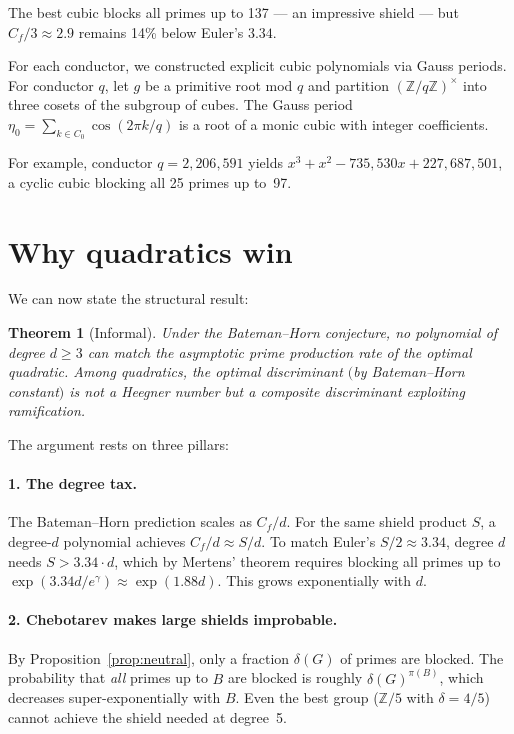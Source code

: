 \documentclass[11pt,a4paper]{article}
\newtheorem{theorem}{Theorem}
\theoremstyle{definition}
\theoremstyle{remark}
\newcommand{\Z}{\mathbb{Z}}
\begin{document}
The best cubic blocks all primes up to 137 --- an impressive shield --- but $C_f/3 \approx 2.9$ remains 14\% below Euler's $3.34$.

For each conductor, we constructed explicit cubic polynomials via Gauss periods.
For conductor $q$, let $g$ be a primitive root mod $q$ and partition $(\Z/q\Z)^\times$ into three cosets of the subgroup of cubes.
The Gauss period $\eta_0 = \sum_{k \in C_0} \cos(2\pi k/q)$ is a root of a monic cubic with integer coefficients.

For example, conductor $q = 2{,}206{,}591$ yields $x^3 + x^2 - 735{,}530x + 227{,}687{,}501$, a cyclic cubic blocking all 25 primes up to~97.


\section{Why quadratics win}\label{sec:why}

We can now state the structural result:

\begin{theorem}[Informal]
Under the Bateman--Horn conjecture, no polynomial of degree $d \geq 3$ can match the asymptotic prime production rate of the optimal quadratic.
Among quadratics, the optimal discriminant $($by Bateman--Horn constant$)$ is not a Heegner number but a composite discriminant exploiting ramification.
\end{theorem}

The argument rests on three pillars:

\paragraph{1. The degree tax.}
The Bateman--Horn prediction scales as $C_f/d$.
For the same shield product $S$, a degree-$d$ polynomial achieves $C_f/d \approx S/d$.
To match Euler's $S/2 \approx 3.34$, degree $d$ needs $S > 3.34 \cdot d$, which by Mertens' theorem requires blocking all primes up to $\exp(3.34d / e^\gamma) \approx \exp(1.88d)$.
This grows exponentially with $d$.

\paragraph{2. Chebotarev makes large shields improbable.}
By Proposition~\ref{prop:neutral}, only a fraction $\delta(G)$ of primes are blocked.
The probability that \emph{all} primes up to $B$ are blocked is roughly $\delta(G)^{\pi(B)}$, which decreases super-exponentially with $B$.
Even the best group ($\Z/5$ with $\delta = 4/5$) cannot achieve the shield needed at degree~5.
\end{document}
